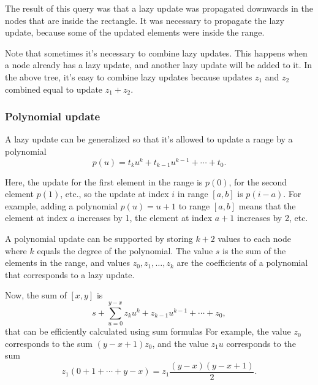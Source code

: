 \begin{center}
\end{center}
The result of this query was that a lazy update was
propagated downwards in the nodes that are inside the rectangle.
It was necessary to propagate the lazy update,
because some of the updated elements were inside the range.

Note that sometimes it's necessary to combine lazy updates.
This happens when a node already has a lazy update,
and another lazy update will be added to it.
In the above tree, it's easy to combine lazy updates
because updates $z_1$ and $z_2$ combined equal to update $z_1+z_2$.

\subsubsection{Polynomial update}

A lazy update can be generalized so that it's
allowed to update a range by a polynomial
\[p(u) = t_k u^k + t_{k-1} u^{k-1} + \cdots + t_0.\]

Here, the update for the first element in the range is $p(0)$,
for the second element $p(1)$, etc., so the update
at index $i$ in range $[a,b]$ is $p(i-a)$.
For example, adding a polynomial $p(u)=u+1$
to range $[a,b]$ means that the element at index $a$
increases by 1, the element at index $a+1$
increases by 2, etc.

A polynomial update can be supported by
storing $k+2$ values to each node where $k$
equals the degree of the polynomial.
The value $s$ is the sum of the elements in the range,
and values $z_0,z_1,\ldots,z_k$ are the coefficients
of a polynomial that corresponds to a lazy update.

Now, the sum of $[x,y]$ is
\[s+\sum_{u=0}^{y-x} z_k u^k + z_{k-1} u^{k-1} + \cdots + z_0,\]
that can be efficiently calculated using sum formulas
For example, the value $z_0$ corresponds to the sum
$(y-x+1)z_0$, and the value $z_1 u$ corresponds to the sum
\[z_1(0+1+\cdots+y-x) = z_1 \frac{(y-x)(y-x+1)}{2} .\]

